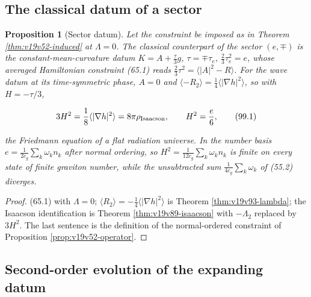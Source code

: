 \documentclass[11pt]{article}
\newtheorem{proposition}[theorem]{Proposition}
\theoremstyle{remark}
\begin{document}
\subsection{The classical datum of a sector}

\begin{proposition}[Sector datum]
\label{prop:v19v96-datum}
Let the constraint be imposed as in Theorem \ref{thm:v19v52-induced}
at \(\Lambda=0\).  The classical counterpart of the sector \((e,\mp)\)
is the constant-mean-curvature datum \(K=A+\tfrac\tau3g\),
\(\tau=\mp\tau_e\), \(\tfrac23\tau_e^2=e\), whose averaged
Hamiltonian constraint (65.1) reads \(\tfrac23\tau^2=\langle|A|^2-R\rangle\).
For the wave datum at its time-symmetric phase, \(A=0\) and
\(\langle-R_2\rangle=\tfrac14\langle|\nabla h|^2\rangle\), so with
\(H=-\tau/3\),

\[
 3H^2=\frac18\langle|\nabla h|^2\rangle=8\pi\rho_{\rm Isaacson},
 \qquad H^2=\frac e6,                                                  \tag{99.1}
\]

the Friedmann equation of a flat radiation universe.  In the number
basis \(e=\tfrac1{2c_g}\sum_k\omega_kn_k\) after normal ordering, so
\(H^2=\tfrac1{12c_g}\sum_k\omega_kn_k\) is finite on every state of
finite graviton number, while the unsubtracted sum
\(\tfrac1{4c_g}\sum_k\omega_k\) of (55.2) diverges.
\end{proposition}

\begin{proof}
(65.1) with \(\Lambda=0\); \(\langle R_2\rangle=-\tfrac14\langle|\nabla h|^2\rangle\)
is Theorem \ref{thm:v19v93-lambda}; the Isaacson identification is
Theorem \ref{thm:v19v89-isaacson} with \(-\Lambda_2\) replaced by
\(3H^2\).  The last sentence is the definition of the normal-ordered
constraint of Proposition \ref{prop:v19v52-operator}.
\end{proof}

\subsection{Second-order evolution of the expanding datum}
\end{document}

